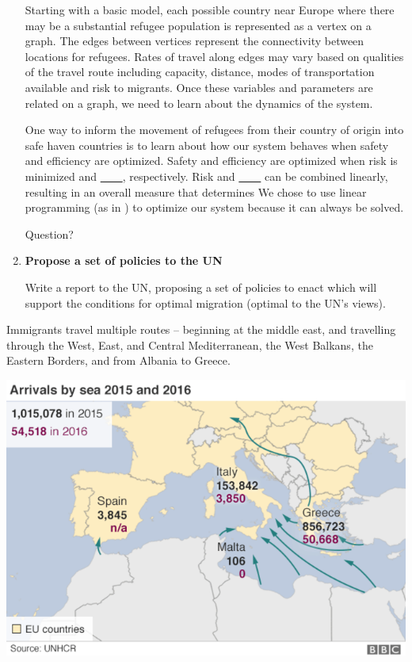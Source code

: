 \documentclass{article}
\begin{document}
\begin{enumerate}
    Starting with a basic model, each possible country near Europe where there may be a substantial refugee population is represented as a vertex on a graph. The edges between vertices represent the connectivity between locations for refugees. Rates of travel along edges may vary based on qualities of the travel route including capacity, distance, modes of transportation available and risk to migrants. Once these variables and parameters are related on a graph, we need to learn about the dynamics of the system.


    One way to inform the movement of refugees from their country of origin into safe haven countries is to learn about how our system behaves when safety and efficiency are optimized. Safety and efficiency are optimized when risk is minimized and \underline{\ \ \ \ }, respectively. Risk and \underline{\ \ \ \ } can be combined linearly, resulting in an overall measure that determines We chose to use linear programming (as in \cite{bertsekas}) to optimize our system because it can always be solved. 

    Question?

    \item {\bf Propose a set of policies to the UN}

    Write a report to the UN, proposing a set of policies to enact which will support the conditions for optimal migration (optimal to the UN's views).
\end{enumerate}

Immigrants travel multiple routes -- beginning at the middle east, and travelling through the West, East, and Central Mediterranean, the West Balkans, the Eastern Borders, and from Albania to Greece.

\begin{center}
\includegraphics[scale=0.5]{travelmap}
\end{center}
\end{document}

